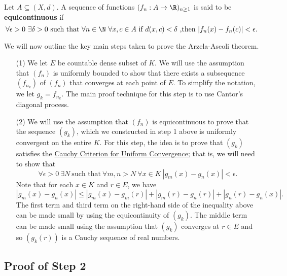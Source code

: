 \begin{definition}
    Let \( A \subseteq (X,d) \). A sequence of functions \( ({f}_{n} : A \to \R)_{n \geq 1} \) is said to be \textbf{equicontinuous} if 
    \[  \forall \epsilon > 0 \ \exists \delta > 0 \ \text{such that} \ \forall n \in \N \ \forall x,c \in A \ \text{if} \ d(x,c) < \delta \ \text{,then} \ | {f}_{n}(x) - {f}_{n}(c) |  < \epsilon. \]
\end{definition}

We will now outline the key main steps taken to prove the Arzela-Ascoli theorem. 

\begin{enumerate}
\item[(1)] We let \( E  \) be countable dense subset of \( K   \). We will use the assumption that \( ({f}_{n}) \) is uniformly bounded to show that there exists a subsequence \( ({f}_{{n}_{k }}) \) of \( ({f}_{n}) \) that converges at each point of \( E  \). To simplify the notation, we let \( {g}_{k } = {f}_{{n}_{k }} \). The main proof technique for this step is to use Cantor's diagonal process. 
\item[(2)] We will use the assumption that \( ({f}_{n}) \) is equicontinuous to prove that the sequence \( ({g}_{k}) \), which we constructed in step 1 above is uniformly convergent on the entire \(  K  \). For this step, the idea is to prove that \( ({g}_{k}) \) satisfies the {\hyperref[Cauchy Criterion for Uniform Convergence]{Cauchy Criterion for Uniform Convergence}}; that is, we will need to show that 
    \[  \forall \epsilon > 0 \ \exists N \ \text{such that} \ \forall m,n > N \ \forall x \in K \ | {g}_{m}(x) - {g}_{n}(x) | < \epsilon. \]
    Note that for each \( x \in K  \) and \( r \in E  \), we have 
    \[  | {g}_{m}(x) - {g}_{n}(x) | \leq | {g}_{m}(x) - {g}_{m}(r) | + | {g}_{m}(r) - {g}_{n}(r)  |  + | {g}_{n}(r) - {g}_{n}(x) |. \]
    The first term and third term on the right-hand side of the inequality above can be made small by using the equicontinuity of \( ({g}_{k}) \). The middle term can be made small using the assumption that \( ({g}_{k}) \) converges at \( r \in E  \) and so \( ({g}_{k }(r)) \) is a Cauchy sequence of real numbers.
\end{enumerate}

\subsection*{Proof of Step 2}

